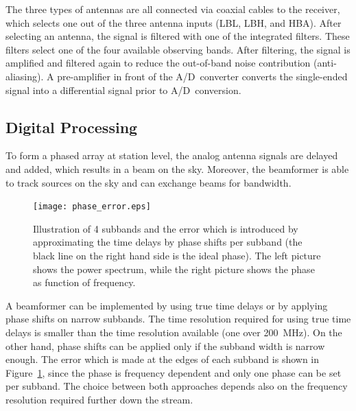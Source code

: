 \documentclass[journal]{IEEEtran}
\begin{document}
The three types of antennas are all connected via coaxial cables to the
receiver, which selects one out of the three antenna inputs (LBL, LBH, and
HBA).
After selecting an antenna, the signal is filtered with one of the integrated
filters.
These filters select one of the four available observing bands.
After filtering, the signal is amplified and filtered again to reduce the
out-of-band noise contribution (anti-aliasing).
A pre-amplifier in front of the A/D~converter converts the single-ended signal
into a differential signal prior to A/D~conversion. 

\subsection{Digital Processing}

To form a phased array at station level, the analog antenna signals are delayed
and added, which results in a beam on the sky.
Moreover, the beamformer is able to track sources on the sky and can exchange
beams for bandwidth. 

\begin{figure}
\begin{center}
\texttt{[image: phase\_error.eps]}
\end{center}
\caption{Illustration of 4 subbands and the error which is introduced by approximating the time delays by phase shifts per subband (the black line on the right hand side is the ideal phase). The left picture shows the power spectrum, while the right picture shows the phase as function of frequency.}
\label{fig:phasebeamf}
\end{figure}

A beamformer can be implemented by using true time delays or by applying phase
shifts on narrow subbands.
The time resolution required for using true time delays is smaller than the
time resolution available (one over 200~MHz).
On the other hand, phase shifts can be applied only if the subband width is
narrow enough.
The error which is made at the edges of each subband is shown in
Figure~\ref{fig:phasebeamf}, since the phase is frequency dependent and only
one phase can be set per subband.
The choice between both approaches depends also on the frequency resolution
required further down the stream.
\end{document}
